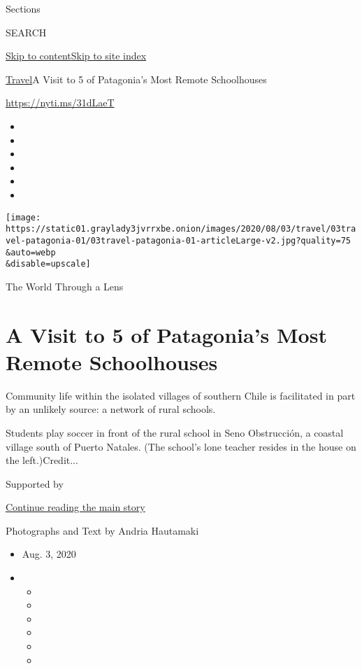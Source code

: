 Sections

SEARCH

\protect\hyperlink{site-content}{Skip to
content}\protect\hyperlink{site-index}{Skip to site index}

\href{/section/travel}{Travel}\textbar{}A Visit to 5 of Patagonia's Most
Remote Schoolhouses

\url{https://nyti.ms/31dLaeT}

\begin{itemize}
\item
\item
\item
\item
\item
\item
\end{itemize}

\texttt{[image: https://static01.graylady3jvrrxbe.onion/images/2020/08/03/travel/03travel-patagonia-01/03travel-patagonia-01-articleLarge-v2.jpg?quality=75\\\&auto=webp\\\&disable=upscale]}

The World Through a Lens

\hypertarget{a-visit-to-5-of-patagonias-most-remote-schoolhouses}{%
\section{A Visit to 5 of Patagonia's Most Remote
Schoolhouses}\label{a-visit-to-5-of-patagonias-most-remote-schoolhouses}}

Community life within the isolated villages of southern Chile is
facilitated in part by an unlikely source: a network of rural schools.

Students play soccer in front of the rural school in Seno Obstrucción, a
coastal village south of Puerto Natales. (The school's lone teacher
resides in the house on the left.)Credit...

Supported by

\protect\hyperlink{after-sponsor}{Continue reading the main story}

Photographs and Text by Andria Hautamaki

\begin{itemize}
\item
  Aug. 3, 2020
\item
  \begin{itemize}
  \item
  \item
  \item
  \item
  \item
  \item
  \end{itemize}
\end{itemize}

